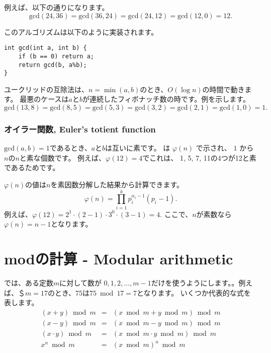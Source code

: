 例えば、以下の通りになります。
\[\textrm{gcd}(24,36) = \textrm{gcd}(36,24)
= \textrm{gcd}(24,12) = \textrm{gcd}(12,0)=12.\]

このアルゴリズムは以下のように実装されます。
\begin{lstlisting}
int gcd(int a, int b) {
    if (b == 0) return a;
    return gcd(b, a%b);
}
\end{lstlisting}

ユークリッドの互除法は、$n=\min(a,b)$のとき、$O(\log n)$の時間で動きます。
最悪のケースは$a$と$b$が連続したフィボナッチ数の時です。例を示します。
\[\textrm{gcd}(13,8)=\textrm{gcd}(8,5)
=\textrm{gcd}(5,3)=\textrm{gcd}(3,2)=\textrm{gcd}(2,1)=\textrm{gcd}(1,0)=1.\]

\subsubsection{オイラー関数, Euler's totient function}


$\textrm{gcd}(a,b)=1$であるとき、$a$と$b$は互いに素です。
 は
$\varphi(n)$ で示され、
$1$ から $n$の$n$と素な個数です。
例えば、$\varphi(12)=4$でこれは、
1, 5, 7, 11の4つが12と素であるためです。

$\varphi(n)$の値は$n$を素因数分解した結果から計算できます。
\[ \varphi(n) = \prod_{i=1}^k p_i^{\alpha_i-1}(p_i-1). \]
例えば、$\varphi(12)=2^1 \cdot (2-1) \cdot 3^0 \cdot (3-1)=4$.
ここで、$n$が素数なら$\varphi(n)=n-1$となります。

\section{modの計算 - Modular arithmetic}


では、ある定数$m$に対して数が
$0,1,2,\ldots,m-1$だけを使うようにします。。例えば、＄$m=17$のとき、$75$は$75 \bmod 17 = 7$となります。
いくつか代表的な式を表します。
\[
\begin{array}{rcl}
(x+y) \bmod m & = & (x \bmod m + y \bmod m) \bmod m \\
(x-y) \bmod m & = & (x \bmod m - y \bmod m) \bmod m \\
(x \cdot y) \bmod m & = & (x \bmod m \cdot y \bmod m) \bmod m \\
x^n \bmod m & = & (x \bmod m)^n \bmod m \\
\end{array}
\]

